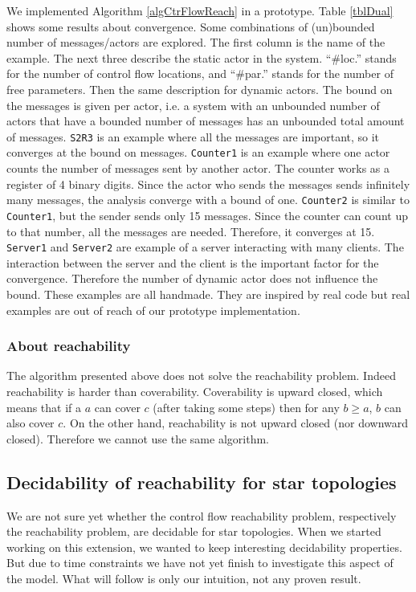 \documentclass[a4paper]{report}
\numberwithin{algorithm}{chapter}
\begin{document}
We implemented Algorithm \ref{algCtrFlowReach} in a prototype.
Table \ref{tblDual} shows some results about convergence.
Some combinations of (un)bounded number of messages/actors are explored.
The first column is the name of the example.
The next three describe the static actor in the system.
``\#loc.'' stands for the number of control flow locations, and ``\#par.'' stands for the number of free parameters. 
Then the same description for dynamic actors.
The bound on the messages is given per actor, i.e. a system with an unbounded number of actors that have a bounded number of messages has an unbounded total amount of messages.
\texttt{S2R3} is an example where all the messages are important, so it converges at the bound on messages.
\texttt{Counter1} is an example where one actor counts the number of messages sent by another actor.
The counter works as a register of 4 binary digits.
Since the actor who sends the messages sends infinitely many messages, the analysis converge with a bound of one.
\texttt{Counter2} is similar to \texttt{Counter1}, but the sender sends only 15 messages.
Since the counter can count up to that number, all the messages are needed.
Therefore, it converges at 15.
\texttt{Server1} and \texttt{Server2} are example of a server interacting with many clients.
The interaction between the server and the client is the important factor for the convergence.
Therefore the number of dynamic actor does not influence the bound.
These examples are all handmade.
They are inspired by real code but real examples are out of reach of our prototype implementation.

\subsubsection{About reachability}
The algorithm presented above does not solve the reachability problem.
Indeed reachability is harder than coverability.
Coverability is upward closed, which means that if a $a$ can cover $c$ (after taking some steps) then for any $b \ge a$, $b$ can also cover $c$.
On the other hand, reachability is not upward closed (nor downward closed).
Therefore we cannot use the same algorithm.

\subsection{Decidability of reachability for star topologies}
We are not sure yet whether the control flow reachability problem, respectively the reachability problem, are decidable for star topologies.
When we started working on this extension, we wanted to keep interesting decidability properties.
But due to time constraints we have not yet finish to investigate this aspect of the model.
What will follow is only our intuition, not any proven result.
\end{document}
